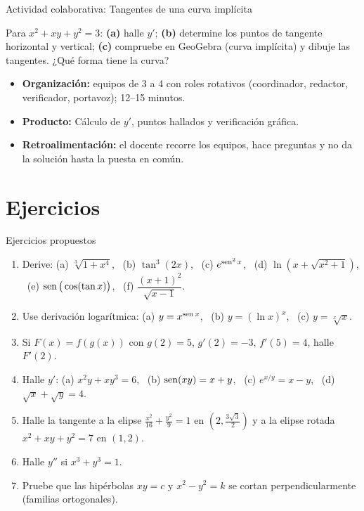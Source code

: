 \documentclass[10pt,aspectratio=169]{beamer}
\begin{document}
\begin{frame}{Actividad colaborativa: Tangentes de una curva implícita}
  \small
  \begin{activa}
    Para $x^2+xy+y^2=3$: \textbf{(a)} halle $y'$; \textbf{(b)} determine los puntos de tangente horizontal y vertical; \textbf{(c)} compruebe en GeoGebra (curva implícita) y dibuje las tangentes. ¿Qué forma tiene la curva?
  \end{activa}
  \begin{itemize}
    \item \textbf{Organización:} equipos de 3 a 4 con roles rotativos (coordinador, redactor, verificador, portavoz); 12--15 minutos.
    \item \textbf{Producto:} Cálculo de $y'$, puntos hallados y verificación gráfica.
    \item \textbf{Retroalimentación:} el docente recorre los equipos, hace preguntas y no da la solución hasta la puesta en común.
  \end{itemize}
\end{frame}

\section{Ejercicios}

\begin{frame}{Ejercicios propuestos}
  \small
  \begin{ejercicio}
    \begin{enumerate}
      \item Derive: (a) $\sqrt[3]{1+x^4}$, \ (b) $\tan^3(2x)$, \ (c) $e^{\operatorname{sen}^2x}$, \ (d) $\ln\left(x+\sqrt{x^2+1}\right)$, \ (e) $\operatorname{sen}\big(\cos(\tan x)\big)$, \ (f) $\dfrac{(x+1)^2}{\sqrt{x-1}}$.
      \item Use derivación logarítmica: (a) $y=x^{\operatorname{sen} x}$, \ (b) $y=(\ln x)^x$, \ (c) $y=\sqrt[x]{x}$.
      \item Si $F(x)=f(g(x))$ con $g(2)=5$, $g'(2)=-3$, $f'(5)=4$, halle $F'(2)$.
      \item Halle $y'$: (a) $x^2y+xy^3=6$, \ (b) $\operatorname{sen}(xy)=x+y$, \ (c) $e^{x/y}=x-y$, \ (d) $\sqrt{x}+\sqrt{y}=4$.
      \item Halle la tangente a la elipse $\frac{x^2}{16}+\frac{y^2}{9}=1$ en $\left(2,\frac{3\sqrt3}{2}\right)$ y a la elipse rotada $x^2+xy+y^2=7$ en $(1,2)$.
      \item Halle $y''$ si $x^3+y^3=1$.
      \item Pruebe que las hipérbolas $xy=c$ y $x^2-y^2=k$ se cortan perpendicularmente (familias ortogonales).
    \end{enumerate}
  \end{ejercicio}
\end{frame}
\end{document}

